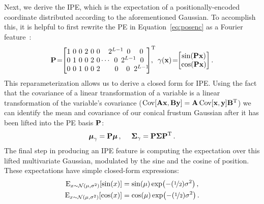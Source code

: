 \documentclass[10pt,twocolumn,letterpaper]{article}
\begin{document}
Next, we derive the IPE, which is the expectation of a positionally-encoded coordinate distributed according to the aforementioned Gaussian. To accomplish this, it is helpful to first rewrite the PE in Equation~\ref{eq:posenc} as a Fourier feature~\cite{Rahimi2007, tancik2020fourfeat}:
\small 
\begin{equation}
\basis\!=\!\!\begin{bmatrix}
1\!\!&\!\!0\!\!&\!\!0\!\!&\!\!2\!\!&\!\!0\!\!&\!\!0\!\!&\!\!\!\!\!\!&\!\!\!\!2^{L-1}\!\!\!\!&\!\!\!\!0\!\!\!\!&\!\!\!\!0\!\! \\
0\!\!&\!\!1\!\!&\!\!0\!\!&\!\!0\!\!&\!\!2\!\!&\!\!0\!\!&\!\!\!\cdots\!\!\!&\!\!\!\!0\!\!\!\!&\!\!\!\!2^{L-1}\!\!\!\!&\!\!\!\!0\!\!\! \\
0\!\!&\!\!0\!\!&\!\!1\!\!&\!\!0\!\!&\!\!0\!\!&\!\!2\!\!&\!\!\!\!\!\!&\!\!\!0\!\!\!\!&\!\!\!\!0\!\!\!&\!\!\!\!2^{L-1}\!\!\\
\end{bmatrix}^\transpose\!\!\!\!,\,\,\,\gamma(\position)\!=\!\!\begin{bmatrix} \sin(\basis\position) \\ \cos(\basis\position) \end{bmatrix}\,.
\end{equation}
\normalsize
This reparameterization allows us to derive a closed form for IPE.
Using the fact that the covariance of a linear transformation of a variable is a linear transformation of the variable's covariance 
($\operatorname{Cov}[\mathbf{A} \mathbf{x}, \mathbf{B}\mathbf{y}] = \mathbf{A} \operatorname{Cov}[\mathbf{x}, \mathbf{y}] \mathbf{B}^{\operatorname{T}}$) we can identify the mean and covariance of our conical frustum Gaussian after it has been lifted into the PE basis $\mathbf{P}$:
\begin{equation}
\boldsymbol{\mu}_\gamma = \mathbf{P} \boldsymbol{\mu}\,, \quad\,\,
\boldsymbol{\Sigma}_\gamma = \mathbf{P} \boldsymbol{\Sigma} \mathbf{P}^{\operatorname{T}}\,.
\end{equation}
The final step in producing an IPE feature is computing the expectation over this lifted multivariate Gaussian, modulated by the sine and the cosine of position. These expectations have simple closed-form expressions:
\begin{align}
    \operatorname{E}_{x \sim \mathcal N(\mu, \sigma^2)}\left[ \sin(x) \right] &= \sin(\mu) \exp\left(-(\nicefrac{1}{2}) \sigma^2 \right)\,, \\
    \operatorname{E}_{x \sim \mathcal N(\mu, \sigma^2)}\left[\cos(x) \right] &= \cos(\mu) \exp\left(-(\nicefrac{1}{2}) \sigma^2 \right) \,.
\end{align}
\end{document}
